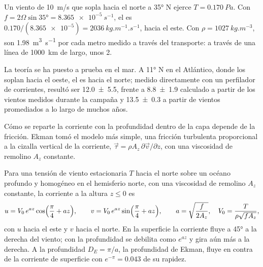 \begin{example}\label{ex:b1:ocean-circulation:transport}
Un viento de \qty{10}{m/s} que sopla hacia el norte a \ang{35} N ejerce $T = \qty{0.170}{Pa}$. Con $f = 2\Omega\sin\ang{35} = \qty{8.365e-5}{s^{-1}}$, el  es $0.170/(\num{8.365e-5}) = \qty{2036}{kg.m^{-1}.s^{-1}}$, hacia el este. Con $\rho = \qty{1027}{kg.m^{-3}}$, son \qty{1.98}{m^3.s^{-1}} por cada metro medido a través del transporte: a través de una línea de \qty{1000}{km} de largo, unos \qty{2}{\sverdrup}.
\end{example}

La teoría se ha puesto a prueba en el mar. A \ang{11} N en el Atlántico, donde los  soplan hacia el oeste, el  es hacia el norte; medido directamente con un perfilador de corrientes, resultó ser \qty[uncertainty-mode=separate]{12.0 \pm 5.5}{\sverdrup}, frente a \qty[uncertainty-mode=separate]{8.8 \pm 1.9}{\sverdrup} calculado a partir de los vientos medidos durante la campaña y \qty[uncertainty-mode=separate]{13.5 \pm 0.3}{\sverdrup} a partir de vientos promediados a lo largo de muchos años.

Cómo se reparte la corriente con la profundidad dentro de la capa depende de la fricción. Ekman tomó el modelo más simple, una fricción turbulenta proporcional a la cizalla vertical de la corriente, $\vec\tau = \rho A_z\,\partial\vec v/\partial z$, con una viscosidad de remolino $A_z$ constante.

\begin{proposition}\label{prop:b1:ocean-circulation:spiral}
Para una tensión de viento estacionaria $T$ hacia el norte sobre un océano profundo y homogéneo en el hemisferio norte, con una viscosidad de remolino $A_z$ constante, la corriente a la altura $z
\leq 0$ es
\[
  u = V_0\,e^{az}\cos\Bigl(\frac\pi4 + az\Bigr),\qquad
  v = V_0\,e^{az}\sin\Bigl(\frac\pi4 + az\Bigr),\qquad
  a = \sqrt{\frac{f}{2A_z}},\quad V_0 = \frac{T}{\rho\sqrt{fA_z}},
\]
con $u$ hacia el este y $v$ hacia el norte. En la superficie la corriente fluye a \ang{45} a la derecha del viento; con la profundidad se debilita como $e^{az}$ y gira aún más a la derecha. A la profundidad $D_E = \pi/a$, la profundidad de Ekman, fluye en contra de la corriente de superficie con $e^{-\pi} = \num{0.043}$ de su rapidez.
\end{proposition}
\admitted

